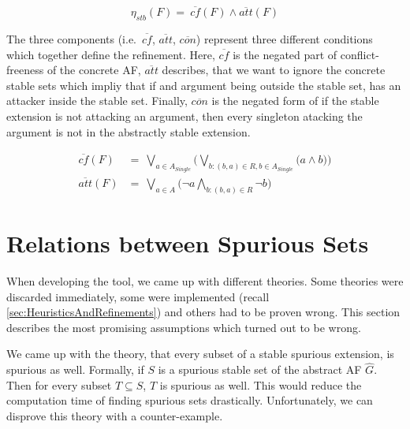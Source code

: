 $$
\eta_{stb}(F) =\ \overline{cf}(F) \land \overline{att}(F)
$$


The three components (i.e.\ $\overline{cf}$, $\overline{att}$, $\overline{con}$) represent three different conditions which together define the refinement. Here, $\overline{cf}$ is the negated part of conflict-freeness of the concrete AF, $\overline{att}$ describes, that we want to ignore the concrete stable sets which impliy that if and argument being outside the stable set, has an attacker inside the stable set. Finally, $\overline{con}$ is the negated form of if the stable extension is not attacking an argument, then every singleton atacking the argument is not in the abstractly stable extension.

\begin{align*}
    \overline{cf}(F)&=\ \bigvee_{a \in A_{\mathit{Single}}} \big( \bigvee_{b:(b,a)\in R, b \in A_{\mathit{Single}}} \big( a \land b \big) \big)\\[0.2cm]
    \overline{att}(F)&=\ \bigvee_{a \in A} \big( \lnot a \bigwedge_{b:(b,a)\in R} \lnot b \big)
\end{align*}


\section{Relations between Spurious Sets }
\label{sec:ImplementationsDisprovedAssumptions}

When developing the tool, we came up with different theories. Some theories were discarded immediately, some were implemented (recall \cref{sec:HeuristicsAndRefinements}) and others had to be proven wrong. This section describes the most promising assumptions which turned out to be wrong.

We came up with the theory, that every subset of a stable spurious extension, is spurious as well. Formally, if $S$ is a spurious stable set of the abstract AF $\hat{G}$. Then for every subset $T \subseteq S$, $T$ is spurious as well. This would reduce the computation time of finding spurious sets drastically. Unfortunately, we can disprove this theory with a counter-example.

